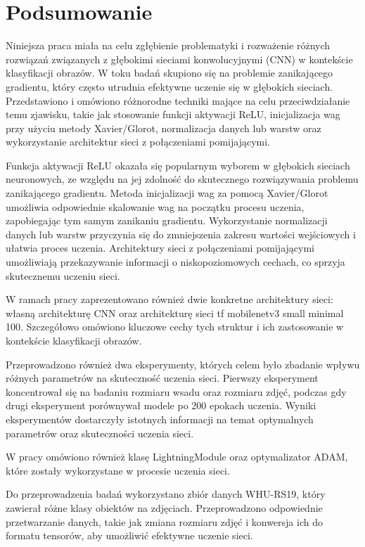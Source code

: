 \documentclass[12pt,twoside]{article}
\begin{document}
\clearpage

\section{Podsumowanie}

Niniejsza praca miała na celu zgłębienie problematyki i rozważenie różnych rozwiązań związanych z głębokimi sieciami konwolucyjnymi (CNN) w kontekście klasyfikacji obrazów. W toku badań skupiono się na problemie zanikającego gradientu, który często utrudnia efektywne uczenie się w głębokich sieciach. Przedstawiono i omówiono różnorodne techniki mające na celu przeciwdziałanie temu zjawisku, takie jak stosowanie funkcji aktywacji ReLU, inicjalizacja wag przy użyciu metody Xavier/Glorot, normalizacja danych lub warstw oraz wykorzystanie architektur sieci z połączeniami pomijającymi.

Funkcja aktywacji ReLU okazała się popularnym wyborem w głębokich sieciach neuronowych, ze względu na jej zdolność do skutecznego rozwiązywania problemu zanikającego gradientu. Metoda inicjalizacji wag za pomocą Xavier/Glorot umożliwia odpowiednie skalowanie wag na początku procesu uczenia, zapobiegając tym samym zanikaniu gradientu. Wykorzystanie normalizacji danych lub warstw przyczynia się do zmniejszenia zakresu wartości wejściowych i ułatwia proces uczenia. Architektury sieci z połączeniami pomijającymi umożliwiają przekazywanie informacji o niskopoziomowych cechach, co sprzyja skutecznemu uczeniu sieci.

W ramach pracy zaprezentowano również dwie konkretne architektury sieci: własną architekturę CNN oraz architekturę sieci tf mobilenetv3 small minimal 100. Szczegółowo omówiono kluczowe cechy tych struktur i ich zastosowanie w kontekście klasyfikacji obrazów.

Przeprowadzono również dwa eksperymenty, których celem było zbadanie wpływu różnych parametrów na skuteczność uczenia sieci. Pierwszy eksperyment koncentrował się na badaniu rozmiaru wsadu oraz rozmiaru zdjęć, podczas gdy drugi eksperyment porównywał modele po 200 epokach uczenia. Wyniki eksperymentów dostarczyły istotnych informacji na temat optymalnych parametrów oraz skuteczności uczenia sieci.

W pracy omówiono również klasę LightningModule oraz optymalizator ADAM, które zostały wykorzystane w procesie uczenia sieci.

Do przeprowadzenia badań wykorzystano zbiór danych WHU-RS19, który zawierał różne klasy obiektów na zdjęciach. Przeprowadzono odpowiednie przetwarzanie danych, takie jak zmiana rozmiaru zdjęć i konwersja ich do formatu tensorów, aby umożliwić efektywne uczenie sieci.
\end{document}
